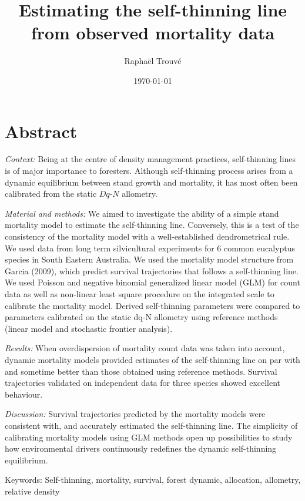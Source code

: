 \documentclass[12pt,english]{article}
\title{Estimating the self-thinning line from observed mortality data}
\author{Raphaël Trouvé}
\date{\today}
\begin{document}
\maketitle

\newpage
\doublespacing
\linenumbers

\section*{Abstract}
  \textit{Context:} Being at the centre of density management practices, self-thinning lines is of major importance to foresters. Although self-thinning process arises from a dynamic equilibrium between stand growth and mortality, it has most often been calibrated from the static $Dq$-$N$ allometry.   
   
  \textit{Material and methods:} We aimed to investigate the ability of a simple stand mortality model to estimate the self-thinning line. Conversely, this is a test of the consistency of the mortality model with a well-established dendrometrical rule. We used data from long term silvicultural experiments for 6 common eucalyptus species in South Eastern Australia. We used the mortality model structure from Garcia (2009), which predict survival trajectories that follows a self-thinning line. We used Poisson and negative binomial generalized linear model (GLM) for count data as well as non-linear least square procedure on the integrated scale to calibrate the mortality model. Derived self-thinning parameters were compared to parameters calibrated on the static dq-N allometry using reference methods (linear model and stochastic frontier analysis).  
  
  \textit{Results:} When overdispersion of mortality count data was taken into account, dynamic mortality models provided estimates of the self-thinning line on par with and sometime better than those obtained using reference methods. Survival trajectories validated on independent data for three species showed excellent behaviour.
  
  \textit{Discussion:} Survival trajectories predicted by the mortality models were consistent with, and accurately estimated the self-thinning line. The simplicity of calibrating mortality models using GLM methods open up possibilities to study how environmental drivers continuously redefines the dynamic self-thinning equilibrium.
  
\bigskip
\textsf{Keywords:} Self-thinning, mortality, survival, forest dynamic, allocation, allometry, relative density
\end{document}
